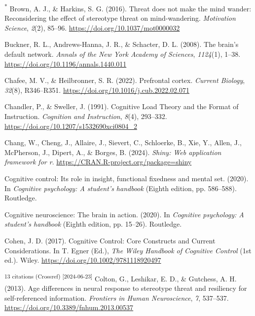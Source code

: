 \documentclass[
  stu, a4paper,floatsintext]{apa7}
\newlength{\cslhangindent}
\newenvironment{CSLReferences}[2] %
 {\begin{list}{}{%
  \setlength{\itemindent}{0pt}
  \setlength{\leftmargin}{0pt}
  \setlength{\parsep}{0pt}
  \ifodd #1
   \setlength{\leftmargin}{\cslhangindent}
   \setlength{\itemindent}{-1\cslhangindent}
  \fi
  \setlength{\itemsep}{#2\baselineskip}}}
 {\end{list}}
\begin{document}
\begin{CSLReferences}{1}{0}
\textsuperscript{*} Brown, A. J., \& Harkins, S. G. (2016). Threat does not make the mind wander: {Reconsidering} the effect of stereotype threat on mind-wandering. \emph{Motivation Science}, \emph{2}(2), 85--96. \url{https://doi.org/10.1037/mot0000032}

Buckner, R. L., Andrews-Hanna, J. R., \& Schacter, D. L. (2008). The brain's default network. \emph{Annals of the New York Academy of Sciences}, \emph{1124}(1), 1--38. \url{https://doi.org/10.1196/annals.1440.011}

Chafee, M. V., \& Heilbronner, S. R. (2022). Prefrontal cortex. \emph{Current Biology}, \emph{32}(8), R346--R351. \url{https://doi.org/10.1016/j.cub.2022.02.071}

Chandler, P., \& Sweller, J. (1991). Cognitive {Load Theory} and the {Format} of {Instruction}. \emph{Cognition and Instruction}, \emph{8}(4), 293--332. \url{https://doi.org/10.1207/s1532690xci0804_2}

Chang, W., Cheng, J., Allaire, J., Sievert, C., Schloerke, B., Xie, Y., Allen, J., McPherson, J., Dipert, A., \& Borges, B. (2024). \emph{Shiny: Web application framework for r}. \url{https://CRAN.R-project.org/package=shiny}

Cognitive control: Its role in insight, functional fixedness and mental set. (2020). In \emph{Cognitive psychology: A student's handbook} (Eighth edition, pp. 586--588). Routledge.

Cognitive neuroscience: The brain in action. (2020). In \emph{Cognitive psychology: A student's handbook} (Eighth edition, pp. 15--26). Routledge.

Cohen, J. D. (2017). Cognitive {Control}: {Core Constructs} and {Current Considerations}. In T. Egner (Ed.), \emph{The {Wiley Handbook} of {Cognitive Control}} (1st ed.). Wiley. \url{https://doi.org/10.1002/9781118920497}

\textsuperscript{13 citations (Crossref) {[}2024-06-23{]}} Colton, G., Leshikar, E. D., \& Gutchess, A. H. (2013). Age differences in neural response to stereotype threat and resiliency for self-referenced information. \emph{Frontiers in Human Neuroscience}, \emph{7}, 537--537. \url{https://doi.org/10.3389/fnhum.2013.00537}


\end{CSLReferences}
\end{document}

